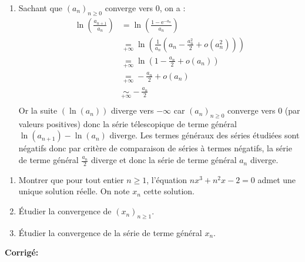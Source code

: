 \documentclass[a4paper,twoside,french,10pt]{VcCours}
\newcommand{\corr}{\textbf{Corrigé:}}
\begin{document}
\begin{enumerate}
\item  Sachant que $(a_n)_{n \geq 0}$ converge vers $0$, on a :
\begin{align*}
\ln \left( {\frac{{a_{n + 1} }}{{a_n }}} \right) & =  \ln \left( {\frac{1 - {\mathrm{e}}^{ - a_n }}{{a_n }}} \right) \\
&  \underset{+ \infty}{=}  \ln \left( \frac{1}{a_n}\left(a_n-\frac{a_n^2}{2}+ o\left(a_n^2\right)\right) \right)\\
& \underset{+ \infty}{=}  	\ln \left(1-\frac{a_n}{2}+ o\left(a_n\right) \right) \\
& \underset{+ \infty}{=} -\frac{a_n}{2}+ o\left(a_n\right) \\
& \underset{+ \infty}{\sim} -\frac{a_n}{2} \\
\end{align*}
Or la suite $(\ln(a_n))$ diverge vers $-\infty$ car $(a_n)_{n \geq 0}$ converge vers $0$ (par valeurs positives) donc la série télescopique de terme général $\ln(a_{n+1})-\ln(a_n)$ diverge. Les termes généraux des séries étudiées sont négatifs donc par critère de comparaison de séries à termes négatifs, la série de terme général $ \frac{a_n}{2}$ diverge et donc la série de terme général $a_n$ diverge.
\end{enumerate}

\medskip


\begin{Exercice}{} 
\begin{enumerate}
\item Montrer que pour tout entier $n \geq 1$, l'équation $nx^3+n^2x-2=0$ admet une unique solution réelle. On note $x_n$ cette solution.
\item Étudier la convergence de $(x_n)_{n \geq 1}$.
\item Étudier la convergence de la série de terme général $x_n$.
\end{enumerate}
\end{Exercice}

\corr 
\end{document}
